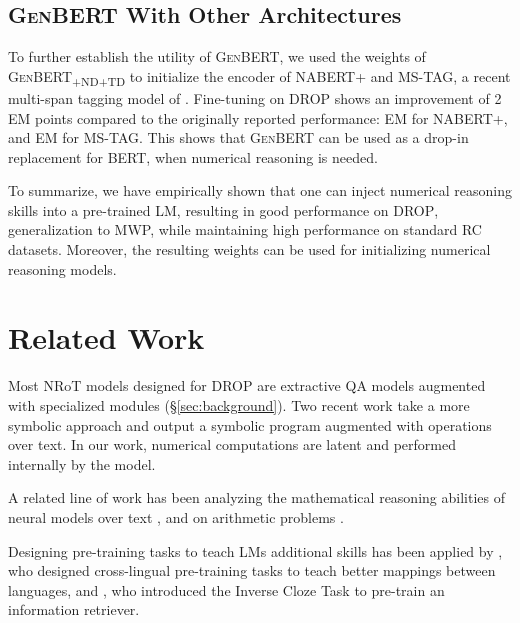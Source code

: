 \documentclass[11pt,a4paper]{article}
\newcommand\ssc[1]{\textsubscript{\textsc{#1}}}
\newcommand\bert{\textsc{BERT}}
\newcommand\genbert{\textsc{GenBERT}}
\newcommand\nabert{\textsc{NABERT+}}
\newcommand\drop{\textsc{DROP}}
\begin{document}
\subsection{\genbert{} With Other Architectures} 
To further establish the utility of \genbert{}, we used the weights of \textsc{GenBERT\ssc{+ND+TD}} to initialize the encoder of \nabert{} and \textsc{MS-TAG}, a recent multi-span tagging model of \citet{efrat2019tag}. 
Fine-tuning on \drop{} 
shows an improvement of 2 EM points compared to the originally reported performance:  EM for \nabert{}, and  EM for \textsc{MS-TAG}. This shows that \genbert{} can be used as a drop-in replacement for \bert{}, when numerical reasoning is needed.




To summarize, we have empirically shown that one 
can inject numerical reasoning skills into a pre-trained LM, resulting in good performance on \drop{}, generalization to MWP, while maintaining high performance on standard RC datasets. Moreover, the resulting weights can be used for initializing numerical reasoning models. \section{Related Work}









Most NRoT models designed for \drop{} are extractive QA models augmented with specialized modules (\S\ref{sec:background}).
Two recent work \cite{andor2019giving, chen2020neural} take a more symbolic approach and output a symbolic program augmented with operations over text.
In our work, numerical computations are latent and performed internally by the model.

A related line of work has been analyzing the mathematical reasoning abilities of neural models over text \cite{wallace2019numeracy, rozen2019diversify, ravichander2019equate}, and on arithmetic problems \cite{saxton2019analysing, amini2019mathqa,lample2020deep}.

Designing pre-training tasks to teach LMs additional skills has been applied by \citet{huang2019unicoder}, who designed cross-lingual pre-training tasks to teach better mappings between languages, and \citet{lee2019latent}, who introduced the Inverse Cloze Task to pre-train an information retriever. 
\end{document}
